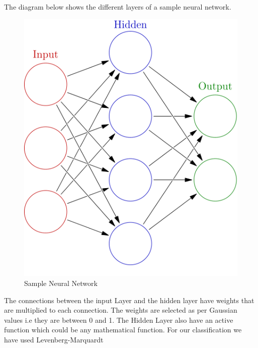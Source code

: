 \documentclass[12pt]{article}
\begin{document}
The diagram below shows the different layers of a sample neural network.
\begin{figure}[H]
\center
\includegraphics [scale=0.5]{ann.png}
\caption{Sample Neural Network}
\end{figure}
The connections between the input Layer and the hidden layer have weights that are multiplied to each connection. The weights are selected as per Gaussian values i.e they are between 0 and 1.
The Hidden Layer also have an active function which could be any mathematical function. For our classification we have used Levenberg-Marquardt
\end{document}
